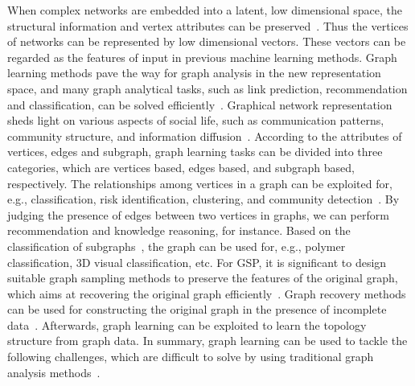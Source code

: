 When complex networks are embedded into a latent, low dimensional space, the structural information and vertex attributes can be preserved~. Thus the vertices of networks can be represented by low dimensional vectors. These vectors can be regarded as the features of input in previous machine learning methods. Graph learning methods pave the way for graph analysis in the new representation space, and many graph analytical tasks, such as link prediction, recommendation and classification, can be solved efficiently~. Graphical network representation sheds light on various aspects of social life, such as communication patterns, community structure, and information diffusion~. According to the attributes of vertices, edges and subgraph, graph learning tasks can be divided into three categories, which are vertices based, edges based, and subgraph based, respectively. The relationships among vertices in a graph can be exploited for, e.g., classification, risk identification, clustering, and community detection~. By judging the presence of edges between two vertices in graphs, we can perform recommendation and knowledge reasoning, for instance. Based on the classification of subgraphs~, the graph can be used for, e.g., polymer classification, 3D visual classification, etc. For GSP, it is significant to design suitable graph sampling methods to preserve the features of the original graph, which aims at recovering the original graph efficiently~. Graph recovery methods can be used for constructing the original graph in the presence of incomplete data~. Afterwards, graph learning can be exploited to learn the topology structure from graph data. In summary, graph learning can be used to tackle the following challenges, which are difficult to solve by using traditional graph analysis methods~.
